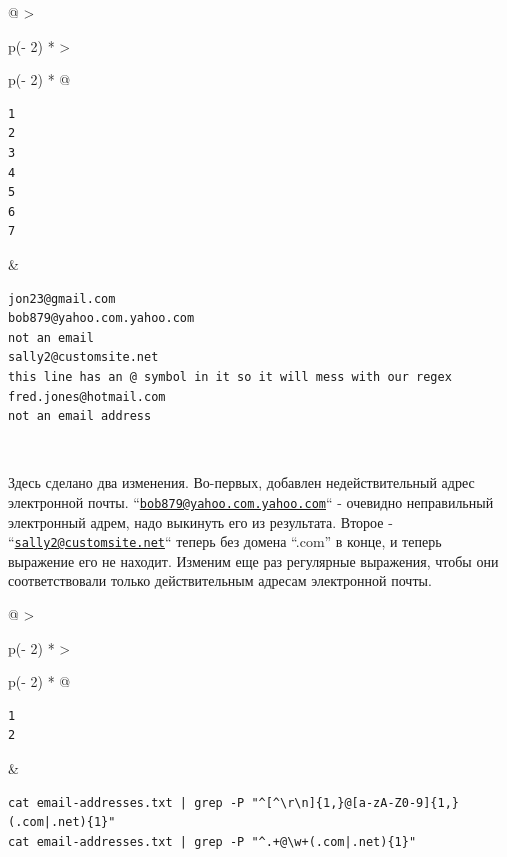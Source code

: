 \documentclass{report}
\begin{document}
\begin{longtable}[]{@{}
  >{\raggedright\arraybackslash}p{(\columnwidth - 2\tabcolsep) * }
  >{\raggedright\arraybackslash}p{(\columnwidth - 2\tabcolsep) * }@{}}
\toprule
\endhead
\begin{minipage}[t]{\linewidth}\raggedright
\begin{verbatim}
1
2
3
4
5
6
7
\end{verbatim}
\end{minipage} & \begin{minipage}[t]{\linewidth}\raggedright
\begin{verbatim}
jon23@gmail.com
bob879@yahoo.com.yahoo.com
not an email
sally2@customsite.net
this line has an @ symbol in it so it will mess with our regex
fred.jones@hotmail.com
not an email address
\end{verbatim}
\end{minipage} \\ \addlinespace
\bottomrule
\end{longtable}

Здесь сделано два изменения. Во-первых, добавлен недействительный адрес
электронной почты.
``\href{mailto:bob879@yahoo.com.yahoo.com}{\nolinkurl{bob879@yahoo.com.yahoo.com}}``
- очевидно неправильный электронный адрем, надо выкинуть его из
результата. Второе -
``\href{mailto:sally2@customsite.net}{\nolinkurl{sally2@customsite.net}}``
теперь без домена ``.com'' в конце, и теперь выражение его не находит.
Изменим еще раз регулярные выражения, чтобы они соответствовали только
действительным адресам электронной почты.

\begin{longtable}[]{@{}
  >{\raggedright\arraybackslash}p{(\columnwidth - 2\tabcolsep) * }
  >{\raggedright\arraybackslash}p{(\columnwidth - 2\tabcolsep) * }@{}}
\toprule
\endhead
\begin{minipage}[t]{\linewidth}\raggedright
\begin{verbatim}
1
2
\end{verbatim}
\end{minipage} & \begin{minipage}[t]{\linewidth}\raggedright
\begin{verbatim}
cat email-addresses.txt | grep -P "^[^\r\n]{1,}@[a-zA-Z0-9]{1,}(.com|.net){1}"
cat email-addresses.txt | grep -P "^.+@\w+(.com|.net){1}"
\end{verbatim}
\end{minipage} \\ \addlinespace
\bottomrule
\end{longtable}
\end{document}
